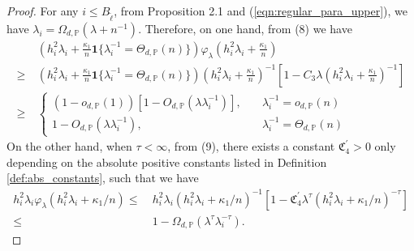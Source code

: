 \documentclass{article}
\theoremstyle{plain}
\theoremstyle{definition}
\theoremstyle{remark}
\newcommand{\reg}{\varphi_\lambda}
\begin{document}
\begin{appendix}
\begin{proof}
\iffalse
For any $i \leq B_{\tilde{\ell}}$, from Proposition 2.1 and (\ref{eqn:regular_para_upper}), we have $\lambda_i = \Omega_{d, \mathbb{P}}( \lambda + n^{-1})$. 
Therefore,
on one hand, from (8)
we have 
\begin{equation}\label{eqn_matrix_ine_1}
    \begin{aligned}
       &~ \left(h_i^2\lambda_i + \frac{\kappa_1}{n}\mathbf{1}\{\lambda_i^{-1} =\Theta_{d, \mathbb{P}}(n)\}\right)\reg\left(h_i^2\lambda_i + \frac{\kappa_1}{n}\right)\\
        \geq &~
         \left(h_i^2\lambda_i + \frac{\kappa_1}{n}\mathbf{1}\{\lambda_i^{-1} =\Theta_{d, \mathbb{P}}(n)\}\right)\left(h_i^2\lambda_i + \frac{\kappa_1}{n}\right)^{-1} \left[1 - C_3 \lambda\left(h_i^2\lambda_i + \frac{\kappa_1}{n}\right)^{-1}\right]\\
        \geq  &~
        \left\{\begin{matrix}
(1-o_{d, \mathbb{P}}(1) ) \left[1 - O_{d, \mathbb{P}}( \lambda\lambda_i^{-1})\right], &\quad \lambda_i^{-1} =o_{d, \mathbb{P}}(n)  \\
1 - O_{d, \mathbb{P}}( \lambda\lambda_i^{-1}), & \quad \lambda_i^{-1} =\Theta_{d, \mathbb{P}}(n)
\end{matrix}\right.
    \end{aligned}
\end{equation}
On the other hand, when $\tau<\infty$, from (9), there exists a constant $\mathfrak{C}_4^{\prime}>0$ only depending on the absolute positive constants listed in Definition \ref{def:abs_constants}, such that we have 
\begin{equation}\label{eqn_matrix_ine_2}
    \begin{aligned}
       h_i^2\lambda_i\reg(h_i^2\lambda_i + \kappa_1 / n)
        \leq &~
         h_i^2\lambda_i(h_i^2\lambda_i + \kappa_1 / n)^{-1} \left[1 - \mathfrak{C}_4^{\prime} \lambda^{\tau}(h_i^2\lambda_i +\kappa_1 / n)^{-\tau}\right]\\
        \leq &~
        1 - \Omega_{d, \mathbb{P}}( \lambda^{\tau}\lambda_i^{-\tau}).
    \end{aligned}
\end{equation}



\end{proof}
\end{appendix}
\end{document}
